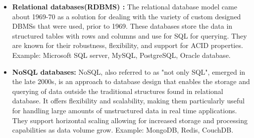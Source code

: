 \begin{itemize}
    \item \textbf{Relational databases(RDBMS) :} The relational database model came about 1969-70 as a solution for dealing with the variety of custom designed DBMSs that were used, prior to 1969. These databases store the data in structured tables with rows and columns and use for SQL for querying. They are known for their robustness, flexibility, and support for ACID properties. Example: Microsoft SQL server, MySQL, PostgreSQL, Oracle database.\cite{editor-2024,foote-2023}
    
    \item \textbf{NoSQL databases:} NoSQL, also referred to as "not only SQL", emerged in the late 2000s, is an approach to database design that enables the storage and querying of data outside the traditional structures found in relational database. It offers flexibility and scalability, making them particularly useful for handling large amounts of unstructured data in real time applications. They support horizontal scaling allowing for increased storage and processing capabilities as data volume grow. Example: MongoDB, Redis, CouchDB.\cite{ibm-2024,justacademy_nosql_characteristics}
\end{itemize}

